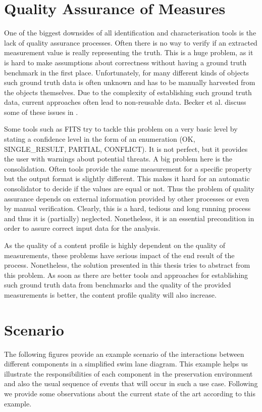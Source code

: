 \section{Quality Assurance of Measures}
One of the biggest downsides of all identification and characterisation tools is the lack of quality assurance processes. Often there is no way to verify if an extracted measurement value is really representing the truth. This is a huge problem, as it is hard to make assumptions about correctness without having a ground truth benchmark in the first place. Unfortunately, for many different kinds of objects such ground truth data is often unknown and has to be manually harvested from the objects themselves. Due to the complexity of establishing such ground truth data, current approaches often lead to non-reusable data. Becker et al. discuss some of these issues in \cite{becker:decision}.

Some tools such as FITS try to tackle this problem on a very basic level by stating a confidence level in the form of an enumeration (OK, SINGLE\_RESULT, PARTIAL, CONFLICT). It is not perfect, but it provides the user with warnings about potential threats.
A big problem here is the consolidation. Often tools provide the same measurement for a specific property but the output format is slightly different. This makes it hard for an automatic consolidator to decide if the values are equal or not. Thus the problem of quality assurance depends on external information provided by other processes or even by manual verification. 
Clearly, this is a hard, tedious and long running process and thus it is (partially) neglected.
Nonetheless, it is an essential precondition in order to assure correct input data for the analysis.

As the quality of a content profile is highly dependent on the quality of measurements, these problems have serious impact of the end result of the process. Nonetheless, the solution presented in this thesis tries to abstract from this problem. As soon as there are better tools and approaches for establishing such ground truth data from benchmarks and the quality of the provided measurements is better, the content profile quality will also increase.

\section{Scenario}
The following figures provide an example scenario of the interactions between different components in a simplified swim lane diagram. This example helps us illustrate the responsibilities of each component in the preservation environment and also the usual sequence of events that will occur in such a use case. Following we provide some observations about the current state of the art according to this example.

